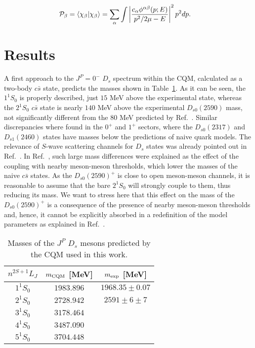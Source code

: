 \documentclass[aps, prd, floatfix, twocolumn, superscriptaddress, nofootinbib]{revtex4-1}
\begin{document}
\begin{align}
{\cal P}_\beta&=\langle \chi_\beta|\chi_\beta\rangle = \sum_\alpha\int \left|\frac{c_\alpha\phi^{\alpha\beta}(p;E)}{p^2/2\mu-E}\right|^2p^2dp.
\end{align}
%





\section{Results}
\label{sec:Results}

A first approach to the $J^P=0^-$ $D_s$ spectrum within the CQM, calculated as a two-body $c\bar s$ state, predicts the masses shown in Table~\ref{tab:spectrum}. As it can be seen, the $1^1S_0$ is properly described, just $15$ MeV above the experimental state, whereas the $2^1S_0$ $c\bar s$ state is nearly $140$ MeV above the experimental $D_{s0}(2590)$ mass, not significantly different from the $80$ MeV predicted by Ref.~\cite{Godfrey:1985xj}.
Similar discrepancies where found in the $0^+$ and $1^+$ sectors, where the $D_{s0}(2317)$ and $D_{s1}(2460)$ states have masses below the predictions of naive quark models. 
The relevance of $S$-wave scattering channels for $D_s$ states was already pointed out in Ref.~\cite{PhysRevLett.91.012003}.
In Ref.~\cite{Ortega:2016mms}, such large mass differences were explained as the effect of the coupling with nearby meson-meson thresholds, which lower the masses of the naive $c\bar s$ states. As the $D_{s0}(2590)^+$ is close to open meson-meson channels, it is reasonable to assume that the bare $2^1S_0$ will strongly couple to them, thus reducing its mass.
We want to stress here that this effect on the mass of the $D_{s0}(2590)^+$ is a consequence of the presence of nearby meson-meson thresholds and, hence, it cannot be explicitly absorbed in a redefinition of the model parameters as explained in Ref.~\cite{PhysRevC.77.055206}.


\begin{table}[!t]
\begin{tabular}{ccc}
\hline\hline
 $n^{2S+1}L_J$  & $m_{\rm CQM}$  [MeV] & $m_{\rm exp}$ [MeV] \\ \hline
  $1^1S_0$  & $1983.896$ & $1968.35\pm0.07$ \\
  $2^1S_0$  & $2728.942$ & $2591\pm6\pm7$ \\
  $3^1S_0$  & $3178.464$ &\\
  $4^1S_0$  & $3487.090$ &\\
  $5^1S_0$  & $3704.448$ &\\
  \hline\hline
\end{tabular}
\caption{\label{tab:spectrum} Masses of the $J^P$ $D_s$ mesons predicted by the CQM used in this work. }
\end{table}
\end{document}
